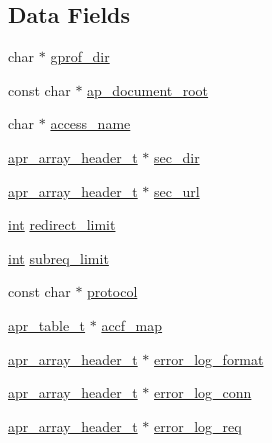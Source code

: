 \subsection*{Data Fields}
\begin{DoxyCompactItemize}
\item 
char $\ast$ \hyperlink{structcore__server__config_a0df479dd50f531cc746183c2612f602b}{gprof\+\_\+dir}
\item 
const char $\ast$ \hyperlink{structcore__server__config_a1114bd381f2cf151e412ed1af7f6c19e}{ap\+\_\+document\+\_\+root}
\item 
char $\ast$ \hyperlink{structcore__server__config_af42f38dd57b8ae2d4c0f291ac8e7db21}{access\+\_\+name}
\item 
\hyperlink{structapr__array__header__t}{apr\+\_\+array\+\_\+header\+\_\+t} $\ast$ \hyperlink{structcore__server__config_a64f4e2dd3da9fcb66ec359910c9ecc17}{sec\+\_\+dir}
\item 
\hyperlink{structapr__array__header__t}{apr\+\_\+array\+\_\+header\+\_\+t} $\ast$ \hyperlink{structcore__server__config_af8809ee619bb2182ea370d6e20bea709}{sec\+\_\+url}
\item 
\hyperlink{pcre_8txt_a42dfa4ff673c82d8efe7144098fbc198}{int} \hyperlink{structcore__server__config_adbd3d5ea5e85ac946176ee2b12cd7d55}{redirect\+\_\+limit}
\item 
\hyperlink{pcre_8txt_a42dfa4ff673c82d8efe7144098fbc198}{int} \hyperlink{structcore__server__config_addfe866338628d9e5efbdb2507f62d42}{subreq\+\_\+limit}
\item 
const char $\ast$ \hyperlink{structcore__server__config_a205136851cc3b22ad2e755fbb8d08a92}{protocol}
\item 
\hyperlink{structapr__table__t}{apr\+\_\+table\+\_\+t} $\ast$ \hyperlink{structcore__server__config_aa2952c287c71806b9d36ec80b2d17a54}{accf\+\_\+map}
\item 
\hyperlink{structapr__array__header__t}{apr\+\_\+array\+\_\+header\+\_\+t} $\ast$ \hyperlink{structcore__server__config_ad57b4c68a108491a5cb9ec15733bdab2}{error\+\_\+log\+\_\+format}
\item 
\hyperlink{structapr__array__header__t}{apr\+\_\+array\+\_\+header\+\_\+t} $\ast$ \hyperlink{structcore__server__config_a2838bd8e8c45609e072296be78e26c6e}{error\+\_\+log\+\_\+conn}
\item 
\hyperlink{structapr__array__header__t}{apr\+\_\+array\+\_\+header\+\_\+t} $\ast$ \hyperlink{structcore__server__config_a46cedf84da8bea3bc1b517bb2a164cb3}{error\+\_\+log\+\_\+req}
\item 

\end{DoxyCompactItemize}
